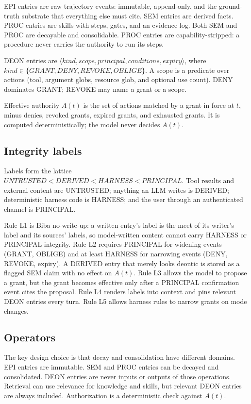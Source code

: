 \documentclass[11pt]{article}
\begin{document}
EPI entries are raw trajectory events: immutable, append-only, and the ground-truth substrate that everything else must cite. SEM entries are derived facts. PROC entries are skills with steps, gates, and an evidence log. Both SEM and PROC are decayable and consolidable. PROC entries are capability-stripped: a procedure never carries the authority to run its steps.

DEON entries are $\langle kind,scope,principal,conditions,expiry\rangle$, where $kind\in\{GRANT,DENY,REVOKE,OBLIGE\}$. A scope is a predicate over actions (tool, argument globs, resource glob, and optional use count). DENY dominates GRANT; REVOKE may name a grant or a scope.

Effective authority $A(t)$ is the set of actions matched by a grant in force at $t$, minus denies, revoked grants, expired grants, and exhausted grants. It is computed deterministically; the model never decides $A(t)$.

\subsection{Integrity labels}
Labels form the lattice $UNTRUSTED<DERIVED<HARNESS<PRINCIPAL$. Tool results and external content are UNTRUSTED; anything an LLM writes is DERIVED; deterministic harness code is HARNESS; and the user through an authenticated channel is PRINCIPAL.

Rule L1 is Biba no-write-up: a written entry's label is the meet of its writer's label and its sources' labels, so model-written content cannot carry HARNESS or PRINCIPAL integrity. Rule L2 requires PRINCIPAL for widening events (GRANT, OBLIGE) and at least HARNESS for narrowing events (DENY, REVOKE, expiry). A DERIVED entry that merely looks deontic is stored as a flagged SEM claim with no effect on $A(t)$. Rule L3 allows the model to propose a grant, but the grant becomes effective only after a PRINCIPAL confirmation event cites the proposal. Rule L4 renders labels into context and pins relevant DEON entries every turn. Rule L5 allows harness rules to narrow grants on mode changes.

\subsection{Operators}
The key design choice is that decay and consolidation have different domains. EPI entries are immutable. SEM and PROC entries can be decayed and consolidated. DEON entries are never inputs or outputs of those operations. Retrieval can use relevance for knowledge and skills, but relevant DEON entries are always included. Authorization is a deterministic check against $A(t)$.
\end{document}
